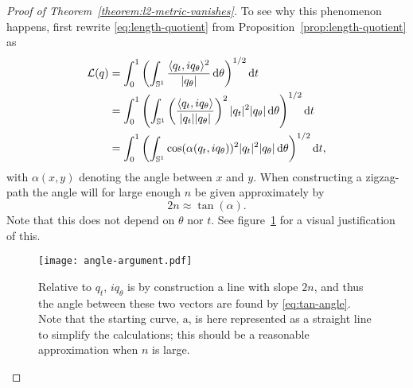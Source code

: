 \begin{proof}[Proof of Theorem~\ref{theorem:l2-metric-vanishes}]
  To see why this  phenomenon happens, first rewrite \eqref{eq:length-quotient} from Proposition~\ref{prop:length-quotient} as
  \begin{align*}
    \mathcal{L}(q) &
                     = \int_{0}^{1}
                     \left(
                     \int_{\mathbb{S}^{1}} \frac{\langle q_{t},i q_{\theta}\rangle^2}
                     {|q_{\theta}|}  \mathop{}\!\mathrm{d} \theta
                     \right)^{1/2} \mathop{}\!\mathrm{d} t \\
                   & =  \int_{0}^{1}
                     \left(
                     \int_{\mathbb{S}^{1}}
                     \left(
                     \frac{\langle q_{t},i
                     q_{\theta}\rangle}{| q_{t}|| q_{\theta}|}
                     \right)^2
                     | q_t|^2   | q_{\theta}|
                     \mathop{}\!\mathrm{d} \theta
                     \right)^{1/2} \mathop{}\!\mathrm{d} t \\
                   &  =
                     \int_{0}^{1}
                     \left(
                     \int_{\mathbb{S}^{1}}
                     \cos(\alpha( q_t, i q_{\theta}))^2
                     | q_t|^2   | q_{\theta}|
                     \mathop{}\!\mathrm{d} \theta
                     \right)^{1/2}\mathop{}\!\mathrm{d} t,
  \end{align*}
  with $\alpha(x,y)$ denoting the angle between $x$ and $y$.
  When constructing a zigzag-path the angle will for large enough $n$ be given approximately by
  \begin{equation}
    \label{eq:tan-angle}
    2n \approx \tan(\alpha).
  \end{equation}
  Note that this does not depend on $\theta$ nor $t$.
  See figure~\ref{fig:angle-arg} for a visual justification of this.
  \begin{figure}[h]
    \centering
    \texttt{[image: angle-argument.pdf]}
    \caption{Relative to $q_t$, $iq_{\theta}$ is by construction a line with slope $2n$, and thus the angle between these two vectors are found by \eqref{eq:tan-angle}. Note that the starting curve, $\mathrm{a}$, is here represented as a straight line to simplify the calculations; this should be a reasonable approximation when $n$ is large.}
    \label{fig:angle-arg}
  \end{figure}


\end{proof}
